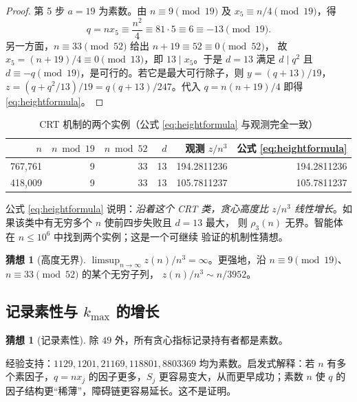 \documentclass[11pt,a4paper]{ctexart}
\theoremstyle{definition}
\newtheorem{conjecture}[theorem]{猜想}
\theoremstyle{remark}
\begin{document}
\begin{proof}
第 5 步 $a=19$ 为素数。由 $n\equiv9\pmod{19}$ 及
$x_5\equiv n/4\pmod{19}$，得
\[
q=nx_5\equiv \frac{n^2}{4}\equiv 81\cdot 5\equiv 6\equiv-13\pmod{19}.
\]
另一方面，$n\equiv33\pmod{52}$ 给出 $n+19\equiv52\equiv0\pmod{52}$，
故 $x_5=(n+19)/4\equiv0\pmod{13}$，即 $13\mid x_5$。于是 $d=13$ 满足
$d\mid q^2$ 且 $d\equiv-q\pmod{19}$，是可行的。若它是最大可行除子，则
$y=(q+13)/19$，$z=(q+q^2/13)/19=q(q+13)/247$。代入
$q=n(n+19)/4$ 即得 \eqref{eq:heightformula}。
\end{proof}

\begin{table}[H]
\centering
\caption{CRT 机制的两个实例（公式 \eqref{eq:heightformula} 与观测完全一致）}
\label{tab:crt}
\small
\begin{tabular}{@{}rrrrrr@{}}
\toprule
$n$ & $n\bmod19$ & $n\bmod52$ & $d$ & 观测 $z/n^3$ & 公式 \eqref{eq:heightformula} \\
\midrule
767{,}761 & 9 & 33 & 13 & 194.2811236 & 194.2811236 \\
418{,}009 & 9 & 33 & 13 & 105.7811237 & 105.7811237 \\
\bottomrule
\end{tabular}
\end{table}

公式 \eqref{eq:heightformula} 说明：\emph{沿着这个 CRT 类，贪心高度比
$z/n^3$ 线性增长}。如果该类中有无穷多个 $n$ 使前四步失败且 $d=13$ 最大，
则 $\rho_3(n)$ 无界。智能体在 $n\le10^6$ 中找到两个实例；这是一个可继续
验证的机制性猜想。

\begin{conjecture}[高度无界]\label{conj:height}
$\displaystyle \limsup_{n\to\infty} z(n)/n^3=\infty$。更强地，沿
$n\equiv9\pmod{19}$、$n\equiv33\pmod{52}$ 的某个无穷子列，
$z(n)/n^3\sim n/3952$。
\end{conjecture}

\subsection{记录素性与 $k_{\max}$ 的增长}

\begin{conjecture}[记录素性]\label{conj:prime}
除 $49$ 外，所有贪心指标记录持有者都是素数。
\end{conjecture}

经验支持：$1129,1201,21169,118801,8803369$ 均为素数。启发式解释：若 $n$
有多个素因子，$q=nx_j$ 的因子更多，$S_j$ 更容易变大，从而更早成功；素数
$n$ 使 $q$ 的因子结构更“稀薄”，障碍链更容易延长。这不是证明。
\end{document}
